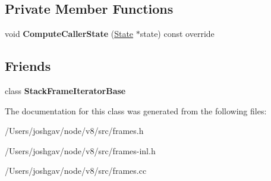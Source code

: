 \subsection*{Private Member Functions}
\begin{DoxyCompactItemize}
\item 
void {\bfseries Compute\+Caller\+State} (\hyperlink{classv8_1_1internal_1_1_state}{State} $\ast$state) const  override\hypertarget{classv8_1_1internal_1_1_exit_frame_a5bfa13a3af4c7fdfc674097990e00413}{}\label{classv8_1_1internal_1_1_exit_frame_a5bfa13a3af4c7fdfc674097990e00413}

\end{DoxyCompactItemize}
\subsection*{Friends}
\begin{DoxyCompactItemize}
\item 
class {\bfseries Stack\+Frame\+Iterator\+Base}\hypertarget{classv8_1_1internal_1_1_exit_frame_ac7310421866976ca454bbe11c5f926c3}{}\label{classv8_1_1internal_1_1_exit_frame_ac7310421866976ca454bbe11c5f926c3}

\end{DoxyCompactItemize}


The documentation for this class was generated from the following files\+:\begin{DoxyCompactItemize}
\item 
/\+Users/joshgav/node/v8/src/frames.\+h\item 
/\+Users/joshgav/node/v8/src/frames-\/inl.\+h\item 
/\+Users/joshgav/node/v8/src/frames.\+cc\end{DoxyCompactItemize}
